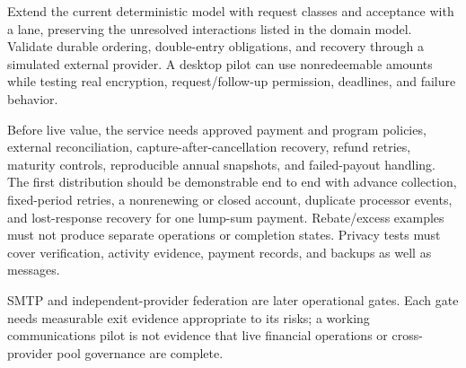 \documentclass[11pt]{article}
\begin{document}
Extend the current deterministic model with request classes and acceptance with
a lane, preserving the unresolved interactions listed in the domain model.
Validate durable ordering, double-entry obligations, and recovery through a
simulated external provider. A desktop pilot can use nonredeemable amounts while testing
real encryption, request/follow-up permission, deadlines, and failure behavior.

Before live value, the service needs approved payment and program policies,
external reconciliation, capture-after-cancellation recovery, refund retries,
maturity controls, reproducible annual snapshots, and failed-payout handling.
The first distribution should be demonstrable end to end with advance collection,
fixed-period retries, a nonrenewing or closed account, duplicate processor events,
and lost-response recovery for one lump-sum payment. Rebate/excess examples must
not produce separate operations or completion states. Privacy
tests must cover verification, activity evidence, payment records, and backups as
well as messages.

SMTP and independent-provider federation are later operational gates. Each gate
needs measurable exit evidence appropriate to its risks; a working communications
pilot is not evidence that live financial operations or cross-provider pool
governance are complete.
\end{document}
